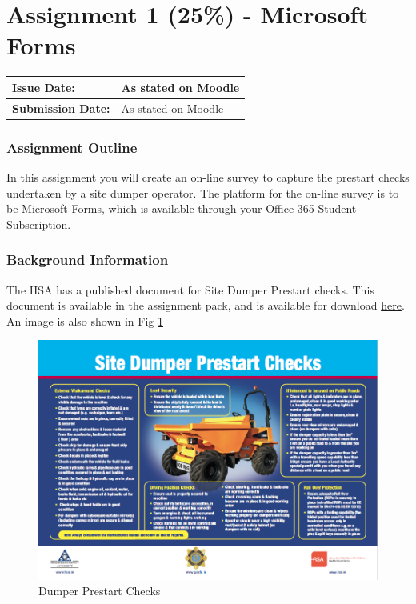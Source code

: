 
	
\part*{Assignment 1 (25\%) - Microsoft Forms}

\begin{tabularx}{\textwidth}{ |X|X| }
	\hline
	\textbf{Issue Date:} & As stated on Moodle \\
	\hline 
	\textbf{Submission Date:}  & As stated on Moodle  \\
	\hline
\end{tabularx}


\section*{Assignment Outline}


In this assignment you will create an on-line survey to capture the prestart checks undertaken by a site dumper operator.  The platform for the on-line survey is to be Microsoft Forms, which is available through your Office 365 Student Subscription.


\section*{Background Information}

The HSA has a published document for Site Dumper Prestart checks.  This document is available in the assignment pack, and is available for download \href{https://www.hsa.ie/eng/Publications_and_Forms/Publications/Construction/Site_Dumper_and_360_Excavator_Pre-start_Checks.html}{here}.  An image is also shown in Fig \ref{fig:DumperPrestartChecks}

\begin{figure}
	\centering
	\includegraphics[width=1.0\linewidth]{./Assignments/img/DumperPrestart.png}
	\caption{Dumper Prestart Checks}
	\label{fig:DumperPrestartChecks}
\end{figure}

